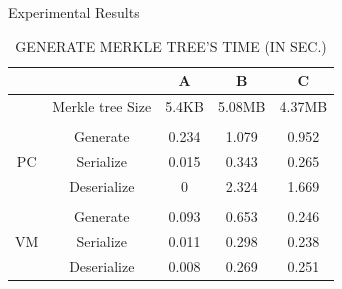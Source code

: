 \documentclass{beamer}
\begin{document}
\begin{CJK}{UTF8}{bkai}
\begin{frame}{Experimental Results}
\begin{table}[]
		\captionsetup{justification=centering}
		\caption{\tiny GENERATE MERKLE TREE'S TIME (IN SEC.)}
		\begin{tabular}{|c|c|c|c|c|}
			\hline
			   &				   &   A   &   B    &   C    \\ \hline
			   & Merkle tree Size & 5.4KB & 5.08MB & 4.37MB \\ \hline
			   &                  &       &        &        \\ \hline
			   & Generate         & 0.234 & 1.079  & 0.952  \\ \cline{2-5} 
			PC & Serialize        & 0.015 & 0.343  & 0.265  \\ \cline{2-5} 
			   & Deserialize      & 0     & 2.324  & 1.669  \\ \hline
		   	   &                  &       &        &        \\ \hline
			   & Generate         & 0.093 & 0.653  & 0.246  \\ \cline{2-5} 
			VM & Serialize        & 0.011 & 0.298  & 0.238  \\ \cline{2-5} 
			   & Deserialize      & 0.008 & 0.269  & 0.251  \\
			\hline
		\end{tabular}
	\end{table}
\end{frame}


\end{CJK}
\end{document}
